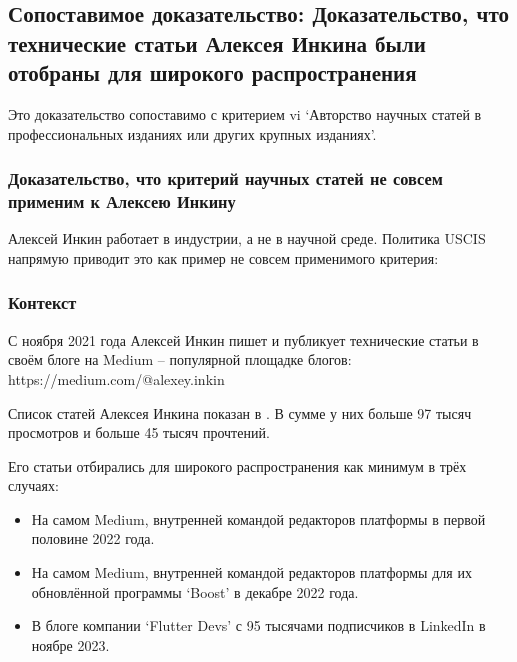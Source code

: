 \subsection{%
    Сопоставимое доказательство: Доказательство, что технические статьи Алексея Инкина были отобраны для широкого распространения%
}
\label{subsec:Articles}

Это доказательство сопоставимо с критерием vi
`Авторство научных статей в профессиональных изданиях или других крупных изданиях'.

\subsubsection{%
    Доказательство, что критерий научных статей не совсем применим к Алексею Инкину%
}

Алексей Инкин работает в индустрии, а не в научной среде.
Политика USCIS напрямую приводит это как пример не совсем применимого критерия:



\subsubsection{%
    Контекст
}

С ноября 2021 года Алексей Инкин пишет и публикует технические статьи в своём блоге на Medium
-- популярной площадке блогов:\\
https://medium.com/@alexey.inkin

Список статей Алексея Инкина показан в .
В сумме у них больше 97 тысяч просмотров и больше 45 тысяч прочтений.

Его статьи отбирались для широкого распространения как минимум в трёх случаях:

\vspace{-0.5\baselineskip}
\vspace{-0.5\baselineskip}
\begin{itemize}[nosep]

    \item На самом Medium, внутренней командой редакторов платформы в первой половине 2022 года.

    \item На самом Medium, внутренней командой редакторов платформы для их обновлённой программы `Boost' в декабре 2022 года.

    \item В блоге компании `Flutter Devs' с 95 тысячами подписчиков в LinkedIn в ноябре 2023.

\end{itemize}

